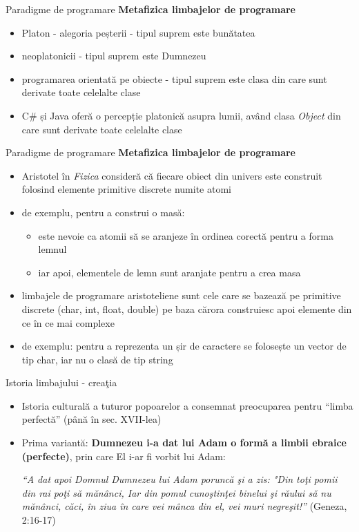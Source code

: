 \documentclass[pdf]{beamer}
\begin{document}
\begin{frame}{Paradigme de programare}
\textbf{Metafizica limbajelor de programare}
\begin{itemize}
\item
Platon - alegoria peșterii - tipul suprem este bunătatea
\item
neoplatonicii - tipul suprem este Dumnezeu
\item
programarea orientată pe obiecte - tipul suprem este clasa din care sunt derivate toate celelalte clase
\item
C\# și Java oferă o percepție platonică asupra lumii, având clasa \textit{Object} din care sunt derivate toate celelalte clase
\end{itemize}
\end{frame}



\begin{frame}{Paradigme de programare}
\textbf{Metafizica limbajelor de programare}
\begin{itemize}
\item
Aristotel în \textit{Fizica} consideră că fiecare obiect din univers este construit folosind elemente primitive discrete numite atomi
\item
de exemplu, pentru a construi o masă: 
\begin{itemize}
\item
este nevoie ca atomii să se aranjeze în ordinea corectă pentru a forma lemnul 
\item
iar apoi, elementele de lemn sunt aranjate pentru a crea masa
\end{itemize}
\item
limbajele de programare aristoteliene sunt cele care se bazează pe primitive discrete (char, int, float, double) pe baza cărora construiesc apoi elemente din ce în ce mai complexe
\item
de exemplu: pentru a reprezenta un șir de caractere se folosește un vector de tip char, iar nu o clasă de tip string
\end{itemize}
\end{frame}



\begin{frame}{Istoria limbajului - creaţia}
\begin{itemize}
\item
Istoria culturală a tuturor popoarelor a consemnat preocuparea pentru “limba perfectă” (până în sec. XVII-lea)
\item
Prima variantă: \textbf{Dumnezeu i-a dat lui Adam o formă a limbii ebraice (perfecte)}, prin care El i-ar fi vorbit lui Adam:

\textit{“A dat apoi Domnul Dumnezeu lui Adam poruncă şi a zis: "Din toţi pomii din rai poţi să mănânci, Iar din pomul cunoştinţei binelui şi răului să nu mănânci, căci, în ziua în care vei mânca din el, vei muri negreşit!”} (Geneza, 2:16-17)
\end{itemize}
\end{frame}
\end{document}

